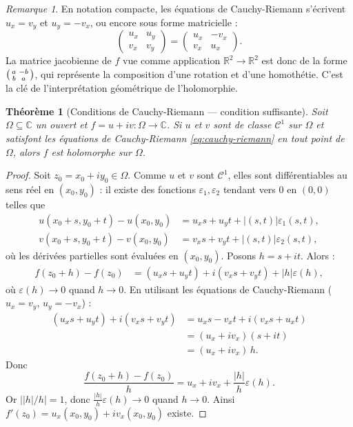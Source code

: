 \documentclass[12pt,a4paper,openany]{book}
\theoremstyle{definition}
\theoremstyle{plain}
\newtheorem{theoreme}[definition]{Théorème}
\theoremstyle{remark}
\newtheorem{remarque}[definition]{Remarque}
\newcommand{\C}{\mathbb{C}}
\newcommand{\R}{\mathbb{R}}
\newcommand{\abs}[1]{\left|#1\right|}
\begin{document}
\begin{remarque}\label{rem:CR-notation-compacte}
En notation compacte, les équations de Cauchy-Riemann s'écrivent $u_x = v_y$ et $u_y = -v_x$, ou encore sous forme matricielle :
\[
  \begin{pmatrix} u_x & u_y \\ v_x & v_y \end{pmatrix} = \begin{pmatrix} u_x & -v_x \\ v_x & u_x \end{pmatrix}.
\]
La matrice jacobienne de $f$ vue comme application $\R^2 \to \R^2$ est donc de la forme $\begin{psmallmatrix} a & -b \\ b & a\end{psmallmatrix}$, qui représente la composition d'une rotation et d'une homothétie. C'est la clé de l'interprétation géométrique de l'holomorphie.
\end{remarque}

\begin{theoreme}[Conditions de Cauchy-Riemann --- condition suffisante]\label{thm:CR-suffisant}
Soit $\Omega \subseteq \C$ un ouvert et $f = u + iv : \Omega \to \C$. Si $u$ et $v$ sont de classe $\mathscr{C}^1$ sur $\Omega$ et satisfont les équations de Cauchy-Riemann \eqref{eq:cauchy-riemann} en tout point de $\Omega$, alors $f$ est holomorphe sur $\Omega$.
\end{theoreme}

\begin{proof}
Soit $z_0 = x_0 + iy_0 \in \Omega$. Comme $u$ et $v$ sont $\mathscr{C}^1$, elles sont différentiables au sens réel en $(x_0,y_0)$ : il existe des fonctions $\varepsilon_1, \varepsilon_2$ tendant vers $0$ en $(0,0)$ telles que
\begin{align*}
  u(x_0+s, y_0+t) - u(x_0,y_0) &= u_x s + u_y t + \abs{(s,t)}\varepsilon_1(s,t), \\
  v(x_0+s, y_0+t) - v(x_0,y_0) &= v_x s + v_y t + \abs{(s,t)}\varepsilon_2(s,t),
\end{align*}
où les dérivées partielles sont évaluées en $(x_0,y_0)$. Posons $h = s + it$. Alors :
\begin{align*}
  f(z_0+h) - f(z_0) &= (u_x s + u_y t) + i(v_x s + v_y t) + \abs{h}\varepsilon(h),
\end{align*}
où $\varepsilon(h) \to 0$ quand $h \to 0$. En utilisant les équations de Cauchy-Riemann ($u_x = v_y$, $u_y = -v_x$) :
\begin{align*}
  (u_x s + u_y t) + i(v_x s + v_y t) &= u_x s - v_x t + i(v_x s + u_x t) \\
  &= (u_x + iv_x)(s + it) \\
  &= (u_x + iv_x)\,h.
\end{align*}
Donc
\[
  \frac{f(z_0+h)-f(z_0)}{h} = u_x + iv_x + \frac{\abs{h}}{h}\varepsilon(h).
\]
Or $\abs{\abs{h}/h} = 1$, donc $\frac{\abs{h}}{h}\varepsilon(h) \to 0$ quand $h \to 0$. Ainsi $f'(z_0) = u_x(x_0,y_0) + iv_x(x_0,y_0)$ existe.
\end{proof}
\end{document}
